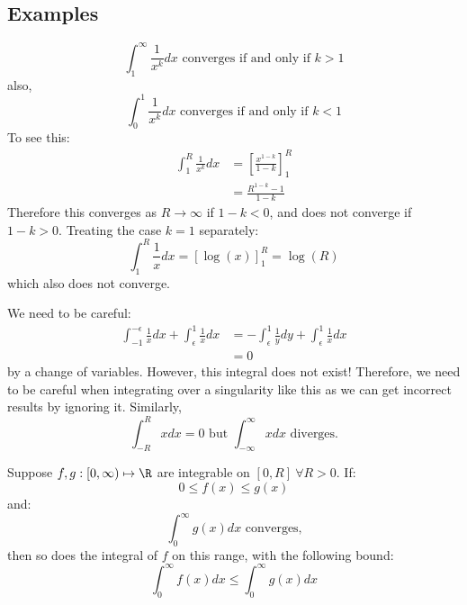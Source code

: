 \documentclass[../Main.tex]{subfiles}
\begin{document}
\subsection{Examples}
\begin{example}
    \begin{equation*}
        \int_1^\infty \frac{1}{x^k} dx \text{ converges if and only if } k > 1
    \end{equation*}
    also,
    \begin{equation*}
        \int_0^1 \frac{1}{x^k} dx \text{ converges if and only if } k < 1
    \end{equation*}
    To see this:
    \begin{align*}
        \int_1^R \frac{1}{x^k} dx &= \left[\frac{x^{1-k}}{1-k}\right]_1^R \\
        &= \frac{R^{1-k}-1}{1-k}
    \end{align*}
    Therefore this converges as $R \to \infty$ if $1 - k < 0$, and does not converge if $1 - k > 0$. Treating the case $k = 1$ separately:
    \begin{equation*}
        \int_1^R \frac{1}{x} dx = \left[\log(x)\right]_1^R = \log(R)
    \end{equation*}
    which also does not converge.
\end{example}
\begin{warning}
    We need to be careful:
    \begin{align*}
        \int_{-1}^{-\epsilon} \frac{1}{x} dx + \int_{\epsilon}^1 \frac{1}{x} dx &= -\int_\epsilon^1 \frac{1}{y} dy + \int_\epsilon^1 \frac{1}{x} dx \\
        &=0
    \end{align*}
    by a change of variables. However, this integral does not exist! Therefore, we need to be careful when integrating over a singularity like this as we can get incorrect results by ignoring it. Similarly,
    \begin{equation*}
        \int_{-R}^R x dx = 0 \text{ but } \int_{-\infty}^\infty x dx \text{ diverges.}
    \end{equation*} 
\end{warning}
\begin{lemma}
    Suppose $f, g : [0, \infty) \mapsto \R$ are integrable on $[0, R]~\forall R > 0$. If:
    \begin{equation*}
        0 \leq f(x) \leq g(x)
    \end{equation*}
    and:
    \begin{equation*}
        \int_0^\infty g(x) dx \text{ converges,}
    \end{equation*}
    then so does the integral of $f$ on this range, with the following bound:
    \begin{equation*}
        \int_0^\infty f(x) dx \leq \int_0^\infty g(x) dx
    \end{equation*}
    \label{lemIntegralComparisonTest}
\end{lemma}
\end{document}
